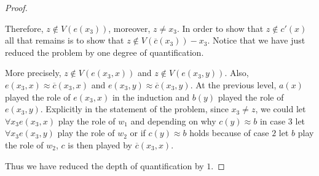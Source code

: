 \documentclass{article}
\theoremstyle{problemstyle}
\theoremstyle{lemmastyle}
\theoremstyle{theoremstyle}
\begin{document}
\begin{proof}
\begin{flushleft}
\end{flushleft}

Therefore, $z \notin V(e(x_3))$, moreover, $z \neq x_3$.  In order to show that $z \notin c'(x)$ all that remains is to show that $z\notin V(\overline{c}(x_3)) - {x_3}$. Notice that we have just reduced the problem by one degree of quantification. 

More precisely, $z \notin V(e(x_3,x))$ and $z \notin V(e(x_3,y))$. Also, $e(x_3,x) \approx \overline{c}(x_3,x)$ and $e(x_3,y) \approx \overline{c}(x_3,y)$.  At the previous level, $a(x)$ played the role of $e(x_3,x)$ in the induction and $b(y)$ played the role of $e(x_3,y)$. Explicitly in the statement of the problem, since $x_3 \neq z$, we could let  $\forall x_3e(x_3,x)$ play the role of $w_1$ and depending on why $c(y) \approx b$ in case 3 let $\forall x_3e(x_3,y)$ play the role of $w_2$ or if $c(y) \approx b$ holds because of case $2$ let $b$ play the role of $w_2$, $c$ is then played by $\overline{c}(x_3,x)$. 

Thus we have reduced the depth of quantification by $1$. 
\end{proof}
\end{document}
